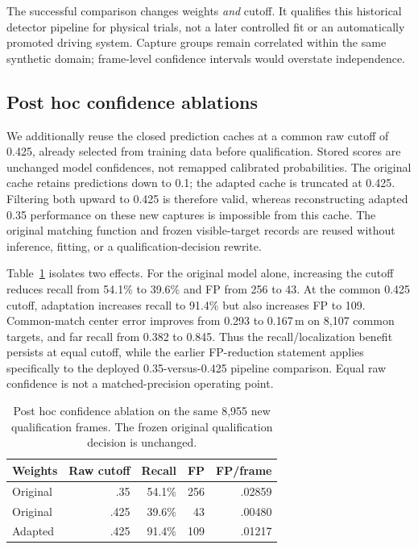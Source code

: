 \documentclass[conference]{IEEEtran}
\begin{document}
The successful comparison changes weights \emph{and} cutoff. It qualifies this historical detector pipeline for physical trials, not a later controlled fit or an automatically promoted driving system. Capture groups remain correlated within the same synthetic domain; frame-level confidence intervals would overstate independence.

\subsection{Post hoc confidence ablations}
We additionally reuse the closed prediction caches at a common raw cutoff of 0.425, already selected from training data before qualification. Stored scores are unchanged model confidences, not remapped calibrated probabilities. The original cache retains predictions down to 0.1; the adapted cache is truncated at 0.425. Filtering both upward to 0.425 is therefore valid, whereas reconstructing adapted 0.35 performance on these new captures is impossible from this cache. The original matching function and frozen visible-target records are reused without inference, fitting, or a qualification-decision rewrite.

Table~\ref{tab:cutoff} isolates two effects. For the original model alone, increasing the cutoff reduces recall from 54.1\% to 39.6\% and FP from 256 to 43. At the common 0.425 cutoff, adaptation increases recall to 91.4\% but also increases FP to 109. Common-match center error improves from 0.293 to 0.167\,m on 8,107 common targets, and far recall from 0.382 to 0.845. Thus the recall/localization benefit persists at equal cutoff, while the earlier FP-reduction statement applies specifically to the deployed 0.35-versus-0.425 pipeline comparison. Equal raw confidence is not a matched-precision operating point.

\begin{table}[t]
\caption{Post hoc confidence ablation on the same 8,955 new qualification frames. The frozen original qualification decision is unchanged.}
\label{tab:cutoff}
\centering\small\setlength{\tabcolsep}{4pt}
\begin{tabular}{lrrrr}
\toprule
Weights & Raw cutoff & Recall & FP & FP/frame\\
\midrule
Original & .35 & 54.1\% & 256 & .02859\\
Original & .425 & 39.6\% & 43 & .00480\\
Adapted & .425 & 91.4\% & 109 & .01217\\
\bottomrule
\end{tabular}
\end{table}
\end{document}
